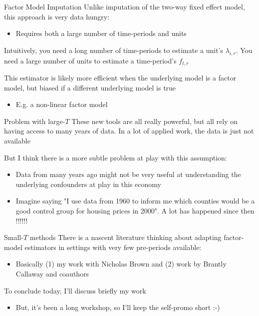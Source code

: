 \documentclass[t]{beamer}
\begin{document}
\begin{frame}{Factor Model Imputation}
  Unlike imputation of the two-way fixed effect model, this approach is very data hungry:
  \begin{itemize}
    \item Requires both a large number of time-periods and units
  \end{itemize}

  \bigskip
  Intuitively, you need a long number of time-periods to estimate a unit's $\lambda_{i,r}$. You need a large number of units to estimate a time-period's $f_{t,r}$

  \pause
  \bigskip
  This estimator is likely more efficient when the underlying model is a factor model, but biased if a different underlying model is true
  \begin{itemize}
    \item E.g. a non-linear factor model
  \end{itemize}
\end{frame}

\begin{frame}{Problem with large-$T$}
  These new tools are all really powerful, but all rely on having access to many years of data.
  In a lot of applied work, the data is just not available

  \pause
  \bigskip
  But I think there is a more subtle problem at play with this assumption: 
  \begin{itemize}
    \item Data from many years ago might not be very useful at understanding the underlying confounders at play in this economy
    \item Imagine saying "I use data from 1960 to inform me which counties would be a good control group for housing prices in 2000". A lot has happened since then !!!!!!
  \end{itemize}
\end{frame}

\begin{frame}{Small-$T$ methods}
  There is a nascent literature thinking about adapting factor-model estimators in settings with very few pre-periods available:
  \begin{itemize}
    \item Basically (1) my work with Nicholas Brown and (2) work by Brantly Callaway and coauthors
  \end{itemize}

  \bigskip
  To conclude today, I'll discuss briefly my work
  \begin{itemize}
    \item But, it's been a long workshop, so I'll keep the self-promo short :-)
  \end{itemize}
\end{frame}
\end{document}

